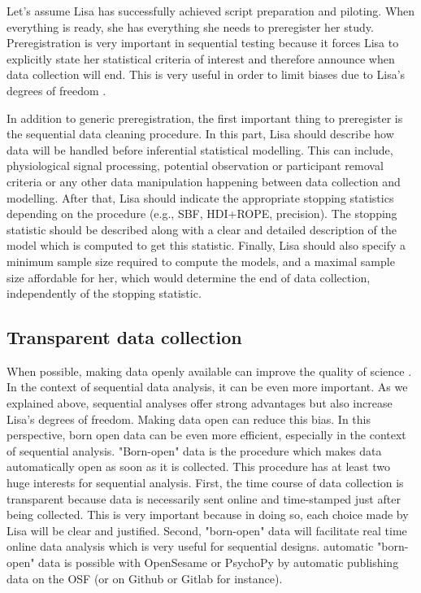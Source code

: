 \documentclass[a4paper,jou,natbib,floatsintext,donotrepeattitle]{apa6}
\begin{document}
Let's assume Lisa has successfully achieved script preparation and piloting. When everything is ready, she has everything she needs to preregister her study. Preregistration is very important in sequential testing because it forces Lisa to explicitly state her statistical criteria of interest and therefore announce when data collection will end. This is very useful in order to limit biases due to Lisa's degrees of freedom \citep{lakens_performing_2014,wicherts_degrees_2016-1}.

In addition to generic preregistration, the first important thing to preregister is the sequential data cleaning procedure. In this part, Lisa should describe how data will be handled before inferential statistical modelling. This can include, physiological signal processing, potential observation or participant removal criteria or any other data manipulation happening between data collection and modelling. After that, Lisa should indicate the appropriate stopping statistics depending on the procedure (e.g., SBF, HDI+ROPE, precision). The stopping statistic should be described along with a clear and detailed description of the model which is computed to get this statistic. Finally, Lisa should also specify a minimum sample size required to compute the models, and a maximal sample size affordable for her, which would determine the end of data collection, independently of the stopping statistic.

\subsection{Transparent data collection}

When possible, making data openly available can improve the quality of science \citep{klein_practical_2018}. In the context of sequential data analysis, it can be even more important. As we explained above, sequential analyses offer strong advantages but also increase Lisa's degrees of freedom. Making data open can reduce this bias. In this perspective, born open data \citep{rouder_what_2016} can be even more efficient, especially in the context of sequential analysis. "Born-open" data is the procedure which makes data automatically open as soon as it is collected. This procedure has at least two huge interests for sequential analysis. First, the time course of data collection is transparent because data is necessarily sent online and time-stamped just after being collected. This is very important because in doing so, each choice made by Lisa will be clear and justified. Second, "born-open" data will facilitate real time online data analysis which is very useful for sequential designs. automatic "born-open" data is possible with OpenSesame or PsychoPy by automatic publishing data on the OSF (or on Github or Gitlab for instance).
\end{document}
